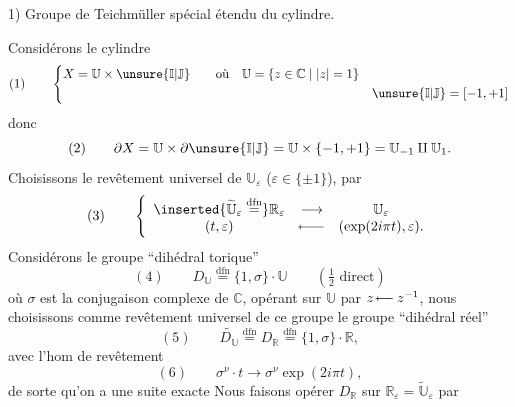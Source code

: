 1) Groupe de Teichmüller spécial étendu du cylindre.

Considérons le cylindre 
\[
(1)\qquad\left\{\begin{aligned}
X&=\mathbb U\times\unsure{\mathbb I|\mathbb J}\qquad\text{où}\quad \mathbb U=\{z\in\mathbb C\mid |z|=1\}\\
&&\unsure{\mathbb I|\mathbb J}=[-1,+1]
\end{aligned}\right.
\]
donc
\[
(2)\qquad \partial X=\mathbb U\times\partial\unsure{\mathbb I|\mathbb J}=\mathbb U\times\{-1,+1\}=\mathbb U_{-1}\amalg\mathbb U_1.
\]
Choisissons le revêtement universel  de $\mathbb U_\varepsilon$ ($\varepsilon\in\{\pm1\}$), par
\[
(3)\qquad\left\{\begin{array}{ccc}
\inserted{\widetilde{\mathbb U}_\varepsilon\overset{\mathrm{dfn}}{=}}\mathbb R_\varepsilon&\longrightarrow&\mathbb U_\varepsilon\\
(t,\varepsilon)&\mathbin{\mapstochar\!\relbar\!\relbar\!\relbar}&(\exp(2i\pi t),\varepsilon).
\end{array}\right.
\]
Considérons le groupe ``dihédral torique''
\[
(4)\qquad D_{\mathbb U}\overset{\mathrm{dfn}}{=}\{1,\sigma\}\cdot\mathbb U\qquad(\tfrac12\text{ direct})
\]
où $\sigma$ est la conjugaison complexe de $\mathbb C$, opérant sur $\mathbb U$ par $z\mathbin{\mapstochar\!\relbar\!\relbar}z^{-1}$, nous choisissons comme revêtement universel de ce groupe le groupe ``dihédral réel''
\[
(5)\qquad \widetilde{D_{\mathbb U}}\overset{\mathrm{dfn}}{=}D_{\mathbb R}\overset{\mathrm{dfn}}{=}\{1,\sigma\}\cdot\mathbb R,
\]
avec l'hom de revêtement
\[
(6)\qquad \sigma^\nu\cdot t\longrightarrow\sigma^\nu\exp(2i\pi t),
\]
de sorte qu'on a une suite exacte
Nous faisons opérer $D_{\mathbb R}$ sur $\mathbb R_\varepsilon=\widetilde{\mathbb U}_\varepsilon$ par
